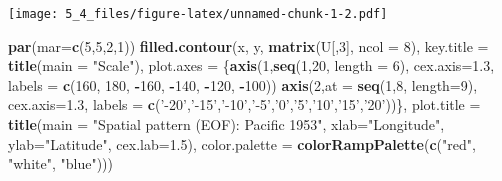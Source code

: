 \documentclass[]{article}
\newenvironment{Shaded}{\begin{snugshade}}{\end{snugshade}}
\newcommand{\KeywordTok}[1]{\textcolor[rgb]{0.13,0.29,0.53}{\textbf{#1}}}
\newcommand{\DataTypeTok}[1]{\textcolor[rgb]{0.13,0.29,0.53}{#1}}
\newcommand{\DecValTok}[1]{\textcolor[rgb]{0.00,0.00,0.81}{#1}}
\newcommand{\FloatTok}[1]{\textcolor[rgb]{0.00,0.00,0.81}{#1}}
\newcommand{\StringTok}[1]{\textcolor[rgb]{0.31,0.60,0.02}{#1}}
\newcommand{\OperatorTok}[1]{\textcolor[rgb]{0.81,0.36,0.00}{\textbf{#1}}}
\newcommand{\NormalTok}[1]{#1}
\begin{document}
\texttt{[image: 5\_4\_files/figure-latex/unnamed-chunk-1-2.pdf]}

\begin{Shaded}
\begin{Highlighting}[]
\KeywordTok{par}\NormalTok{(}\DataTypeTok{mar=}\KeywordTok{c}\NormalTok{(}\DecValTok{5}\NormalTok{,}\DecValTok{5}\NormalTok{,}\DecValTok{2}\NormalTok{,}\DecValTok{1}\NormalTok{))}
\KeywordTok{filled.contour}\NormalTok{(x, y, }\KeywordTok{matrix}\NormalTok{(U[,}\DecValTok{3}\NormalTok{], }\DataTypeTok{ncol =} \DecValTok{8}\NormalTok{), }
               \DataTypeTok{key.title =} \KeywordTok{title}\NormalTok{(}\DataTypeTok{main =} \StringTok{"Scale"}\NormalTok{),}
               \DataTypeTok{plot.axes =}\NormalTok{  \{}\KeywordTok{axis}\NormalTok{(}\DecValTok{1}\NormalTok{,}\KeywordTok{seq}\NormalTok{(}\DecValTok{1}\NormalTok{,}\DecValTok{20}\NormalTok{, }\DataTypeTok{length =} \DecValTok{6}\NormalTok{), }\DataTypeTok{cex.axis=}\FloatTok{1.3}\NormalTok{, }\DataTypeTok{labels =} \KeywordTok{c}\NormalTok{(}\DecValTok{160}\NormalTok{, }\DecValTok{180}\NormalTok{, }\OperatorTok{-}\DecValTok{160}\NormalTok{, }\OperatorTok{-}\DecValTok{140}\NormalTok{, }\OperatorTok{-}\DecValTok{120}\NormalTok{, }\OperatorTok{-}\DecValTok{100}\NormalTok{))  }
                 \KeywordTok{axis}\NormalTok{(}\DecValTok{2}\NormalTok{,}\DataTypeTok{at =} \KeywordTok{seq}\NormalTok{(}\DecValTok{1}\NormalTok{,}\DecValTok{8}\NormalTok{, }\DataTypeTok{length=}\DecValTok{9}\NormalTok{), }\DataTypeTok{cex.axis=}\FloatTok{1.3}\NormalTok{, }\DataTypeTok{labels =} \KeywordTok{c}\NormalTok{(}\StringTok{'-20'}\NormalTok{,}\StringTok{'-15'}\NormalTok{,}\StringTok{'-10'}\NormalTok{,}\StringTok{'-5'}\NormalTok{,}\StringTok{'0'}\NormalTok{,}\StringTok{'5'}\NormalTok{,}\StringTok{'10'}\NormalTok{,}\StringTok{'15'}\NormalTok{,}\StringTok{'20'}\NormalTok{))\},}
               \DataTypeTok{plot.title =} \KeywordTok{title}\NormalTok{(}\DataTypeTok{main =} \StringTok{"Spatial pattern (EOF): Pacific 1953"}\NormalTok{,}
                                  \DataTypeTok{xlab=}\StringTok{"Longitude"}\NormalTok{,}
                                  \DataTypeTok{ylab=}\StringTok{"Latitude"}\NormalTok{, }\DataTypeTok{cex.lab=}\FloatTok{1.5}\NormalTok{),}
               \DataTypeTok{color.palette =} \KeywordTok{colorRampPalette}\NormalTok{(}\KeywordTok{c}\NormalTok{(}\StringTok{"red"}\NormalTok{, }\StringTok{"white"}\NormalTok{, }\StringTok{"blue"}\NormalTok{)))}
\end{Highlighting}
\end{Shaded}
\end{document}
